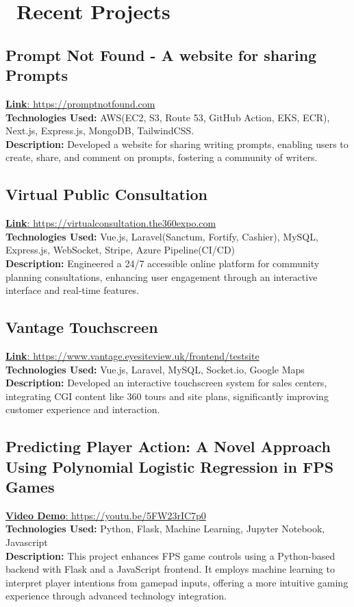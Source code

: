 \documentclass{resume}
\begin{document}
\section{\faServer\ Recent Projects}

\subsection*{\textbf{Prompt Not Found - A website for sharing Prompts}}
\href{https://promptnotfound.com}{\textbf{Link}: https://promptnotfound.com}  \\
\textbf{Technologies Used:} AWS(EC2, S3, Route 53, GitHub Action, EKS, ECR), Next.js, Express.js, MongoDB, TailwindCSS.  \\
\textbf{Description:} Developed a website for sharing writing prompts, enabling users to create, share, and comment on prompts, fostering a community of writers.

\subsection*{\textbf{Virtual Public Consultation}}
\href{https://virtualconsultation.the360expo.com}{\textbf{Link}: https://virtualconsultation.the360expo.com}  \\
\textbf{Technologies Used:} Vue.js, Laravel(Sanctum, Fortify, Cashier), MySQL, Express.js, WebSocket, Stripe, Azure Pipeline(CI/CD) \\
\textbf{Description:} Engineered a 24/7 accessible online platform for community planning consultations, enhancing user engagement through an interactive interface and real-time features.

\subsection*{\textbf{Vantage Touchscreen}}
\href{https://www.vantage.eyesiteview.uk/frontend/testsite}{\textbf{Link}: https://www.vantage.eyesiteview.uk/frontend/testsite}  \\
\textbf{Technologies Used:} Vue.js, Laravel, MySQL, Socket.io, Google Maps \\
\textbf{Description:} Developed an interactive touchscreen system for sales centers, integrating CGI content like 360 tours and site plans, significantly improving customer experience and interaction.

\subsection*{\textbf{Predicting Player Action: A Novel Approach Using Polynomial Logistic Regression in FPS Games}}
\href{https://youtu.be/5FW23rIC7p0}{\textbf{Video Demo}: https://youtu.be/5FW23rIC7p0}  \\
\textbf{Technologies Used:} Python, Flask, Machine Learning, Jupyter Notebook, Javascript \\
\textbf{Description:} This project enhances FPS game controls using a Python-based backend with Flask and a JavaScript frontend. It employs machine learning to interpret player intentions from gamepad inputs, offering a more intuitive gaming experience through advanced technology integration. \\
\end{document}
